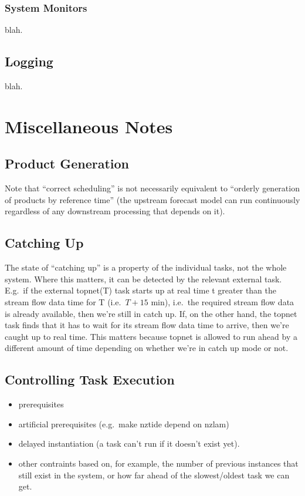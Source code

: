 \documentclass[11pt,a4paper]{article}
\begin{document}
\subsubsection{System Monitors}
blah.

\subsection{Logging}
blah.

\section{Miscellaneous Notes}

\subsection{Product Generation}

Note that ``correct scheduling'' is not necessarily equivalent to
``orderly generation of products by reference time'' (the upstream 
forecast model can run continuously regardless of any downstream
processing that depends on it).

\subsection{Catching Up}

The state of ``catching up'' is a property of the individual tasks, not
the whole system. Where this matters, it can be detected by the relevant
external task. E.g.\ if the external topnet(T) task starts up at real
time t greater than the stream flow data time for T (i.e.\ $T+15$ min),
i.e.\ the required stream flow data is already available, then we're
still in catch up. If, on the other hand, the topnet task finds that it
has to wait for its stream flow data time to arrive, then we're caught
up to real time.  This matters because topnet is allowed to run ahead by
a different amount of time depending on whether we're in catch up mode or
not.

\subsection{Controlling Task Execution}

\begin{itemize}
 \item  prerequisites
 \item artificial prerequisites (e.g.\ make nztide depend on nzlam)
 \item delayed instantiation (a task can't run if it doesn't exist yet).
 \item other contraints based on, for example, the number of previous
 instances that still exist in the system, or how far ahead of the 
 slowest/oldest task we can get.
\end{itemize}
\end{document}
